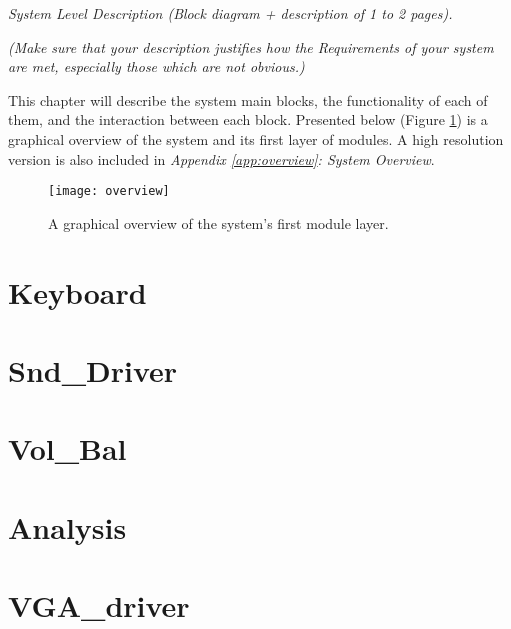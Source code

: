 \emph{System Level Description (Block diagram + description of 1 to 2 pages).}

\emph{(Make sure that your description justifies how the Requirements of your system are met, especially those which are not obvious.)}


This chapter will describe the system main blocks, the functionality of each of them, and the interaction between each block. Presented below (Figure \ref{fig:overview}) is a graphical overview of the system and its first layer of modules. A high resolution version is also included in \emph{Appendix \ref{app:overview}: System Overview}.

\begin{figure}[H]
  \centering
  \texttt{[image: overview]}
  \caption{A graphical overview of the system's first module layer.}
  \label{fig:overview}
\end{figure}

\section{Keyboard}\label{sec:keyboard}


\section{Snd\_Driver}\label{sec:snddriver}


\section{Vol\_Bal}\label{sec:volbal}


\section{Analysis}\label{sec:analysis}


\section{VGA\_driver}\label{sec:vgadriver}


